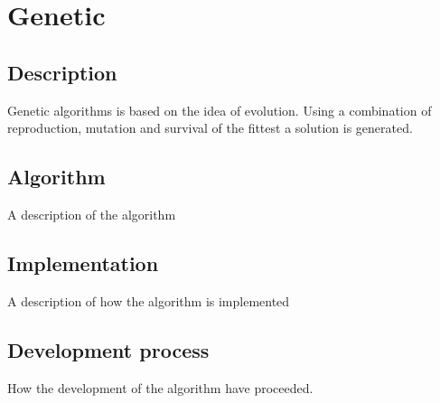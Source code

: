 \section{Genetic}
\subsection{Description}
Genetic algorithms is based on the idea of evolution. Using a combination of reproduction, mutation and survival of the fittest a solution is generated. %
\subsection{Algorithm}
A description of the algorithm\\

\subsection{Implementation}
A description of how the algorithm is implemented
\subsection{ Development process}
How the development of the algorithm have proceeded.\\
